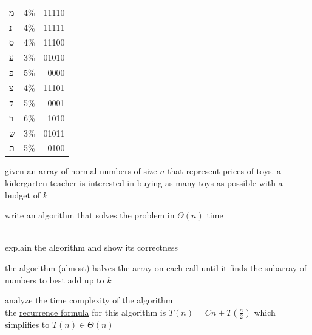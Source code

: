 \documentclass[a4paper,12pt]{article}
\newcommand{\?}{\stackrel{?}{=}}
\begin{document}
\begin{question}
\begin{answer}
\begin{tabular}{llr}
מ & 4\% & 11110\\[0pt]
נ & 4\% & 11111\\[0pt]
ס & 4\% & 11100\\[0pt]
ע & 3\% & 01010\\[0pt]
פ & 5\% & 0000\\[0pt]
צ & 4\% & 11101\\[0pt]
ק & 5\% & 0001\\[0pt]
ר & 6\% & 1010\\[0pt]
ש & 3\% & 01011\\[0pt]
ת & 5\% & 0100\\[0pt]
\end{tabular}
\end{answer}
\end{question}
\begin{question}
given an array of \href{calculus2.org}{normal} numbers of size \(n\) that represent prices of toys. a kidergarten teacher is interested in buying as many toys as possible with a budget of \(k\)\\[0pt]
\begin{subquestion}
write an algorithm that solves the problem in \(\Theta(n)\) time\\[0pt]
\\[0pt]
\end{subquestion}
\begin{subquestion}
explain the algorithm and show its correctness\\[0pt]
\begin{answer}
the algorithm (almost) halves the array on each call until it finds the subarray of numbers to best add up to \(k\)\\[0pt]
\end{answer}
\end{subquestion}
\begin{subquestion}
analyze the time complexity of the algorithm\\[0pt]
the \href{20221105001640-recursive_function.org}{recurrence formula} for this algorithm is \(T(n)=Cn+T\left(\frac{n}{2}\right)\) which simplifies to \(T(n) \in \Theta(n)\)\\[0pt]
\end{subquestion}
\end{question}
\end{document}
